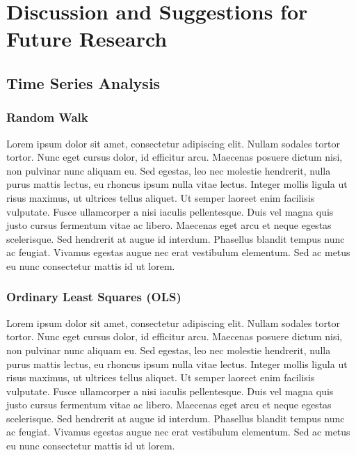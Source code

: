 \chapter{Discussion and Suggestions for Future Research}

\section{Time Series Analysis}

\subsection{Random Walk}
Lorem ipsum dolor sit amet, consectetur adipiscing elit. Nullam sodales tortor tortor. Nunc eget cursus dolor, id efficitur arcu. Maecenas posuere dictum nisi, non pulvinar nunc aliquam eu. Sed egestas, leo nec molestie hendrerit, nulla purus mattis lectus, eu rhoncus ipsum nulla vitae lectus. Integer mollis ligula ut risus maximus, ut ultrices tellus aliquet. Ut semper laoreet enim facilisis vulputate. Fusce ullamcorper a nisi iaculis pellentesque. Duis vel magna quis justo cursus fermentum vitae ac libero. Maecenas eget arcu et neque egestas scelerisque. Sed hendrerit at augue id interdum. Phasellus blandit tempus nunc ac feugiat. Vivamus egestas augue nec erat vestibulum elementum. Sed ac metus eu nunc consectetur mattis id ut lorem.

\subsection{Ordinary Least Squares (OLS)}
Lorem ipsum dolor sit amet, consectetur adipiscing elit. Nullam sodales tortor tortor. Nunc eget cursus dolor, id efficitur arcu. Maecenas posuere dictum nisi, non pulvinar nunc aliquam eu. Sed egestas, leo nec molestie hendrerit, nulla purus mattis lectus, eu rhoncus ipsum nulla vitae lectus. Integer mollis ligula ut risus maximus, ut ultrices tellus aliquet. Ut semper laoreet enim facilisis vulputate. Fusce ullamcorper a nisi iaculis pellentesque. Duis vel magna quis justo cursus fermentum vitae ac libero. Maecenas eget arcu et neque egestas scelerisque. Sed hendrerit at augue id interdum. Phasellus blandit tempus nunc ac feugiat. Vivamus egestas augue nec erat vestibulum elementum. Sed ac metus eu nunc consectetur mattis id ut lorem.

